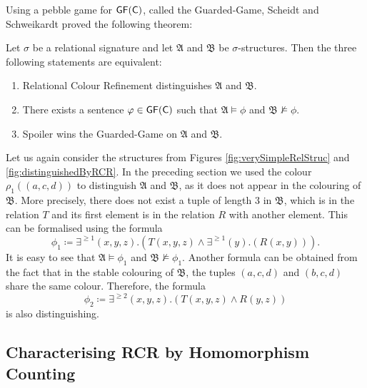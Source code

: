 Using a pebble game for $\mathsf{GF}(\mathsf{C})$, called the Guarded-Game, Scheidt and Schweikardt proved the following theorem:
\begin{theorem}
	Let $\sigma$ be a relational signature and let $\mathfrak A$ and $\mathfrak B$ be $\sigma$-structures.
	Then the three following statements are equivalent:
	\begin{enumerate}
		\item Relational Colour Refinement distinguishes $\mathfrak A$ and $\mathfrak B$.
		\item There exists a sentence $\varphi\in \mathsf{GF}(\mathsf{C})$ such that $\mathfrak A\models \phi$ and $\mathfrak B\not\models\phi$.
		\item Spoiler wins the Guarded-Game on $\mathfrak A$ and $\mathfrak B$.
	\end{enumerate}
\end{theorem}
Let us again consider the structures from Figures \ref{fig:verySimpleRelStruc} and \ref{fig:distinguishedByRCR}.
In the preceding section we used the colour $\rho_1((a,c,d))$ to distinguish $\mathfrak A$ and $\mathfrak B$, as it does not appear in the colouring of $\mathfrak B$.
More precisely, there does not exist a tuple of length $3$ in $\mathfrak B$, which is in the relation $T$ and its first element is in the relation $R$ with another element.
This can be formalised using the formula
$$\phi_1\coloneqq\exists^{\geq 1}(x,y,z).\left(T(x,y,z)\land \exists^{\geq 1} (y).\left( R(x,y)\right)\right).$$
It is easy to see that $\mathfrak A\models \phi_1$ and $\mathfrak B\not\models \phi_1$.
Another formula can be obtained from the fact that in the stable colouring of $\mathfrak B$, the tuples $(a,c,d)$ and $(b,c,d)$ share the same colour.
Therefore, the formula
$$\phi_2\coloneqq \exists^{\geq 2}(x,y,z).\left(T(x,y,z)\land R(y,z)\right)$$
is also distinguishing.

\subsection{Characterising RCR by Homomorphism Counting}

